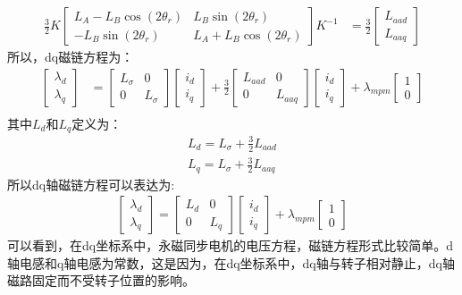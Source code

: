 \begin{align}\label{eq:calculation}
\frac{3}{2}K\begin{bmatrix}
L_{A}-L_{B}\cos(2\theta_{r})&L_{B}\sin(2\theta_{r})\\-L_{B}\sin(2\theta_{r})&L_{A}+L_{B}\cos(2\theta_{r})\end{bmatrix}K^{-1}&=
\frac{3}{2}\begin{bmatrix}L_{aad}\\L_{aaq}\end{bmatrix}
\end{align}
所以，dq磁链方程为：
\begin{align}\label{eq:fluxdq}
\begin{bmatrix}
\lambda_{d}\\\lambda_{q}
\end{bmatrix}
&=\begin{bmatrix}
L_{\sigma}&0\\0&L_{\sigma}\end{bmatrix}
\begin{bmatrix}
i_{d}\\i_{q}
\end{bmatrix}
+\frac{3}{2}\begin{bmatrix}
L_{aad}&0\\0&L_{aaq}\end{bmatrix}
\begin{bmatrix}
i_{d}\\i_{q}
\end{bmatrix}
+
\lambda_{mpm}\begin{bmatrix}
1\\0
\end{bmatrix}\nonumber\\
&
\end{align}
其中$L_{d}$和$L_{q}$定义为：
\begin{align}
L_{d}=L_{\sigma}+\frac{3}{2}L_{aad}\\
L_{q}=L_{\sigma}+\frac{3}{2}L_{aaq}
\end{align}
所以dq轴磁链方程可以表达为:
\begin{align}\label{eq:fluxdq_final}
\begin{bmatrix}
\lambda_{d}\\\lambda_{q}
\end{bmatrix}
=\begin{bmatrix}
	L_{d}&0\\0&L_{q}
\end{bmatrix}\begin{bmatrix}
	i_{d}\\i_{q}
\end{bmatrix}
+
\lambda_{mpm}\begin{bmatrix}
	1\\0
\end{bmatrix}
\end{align}
可以看到，在dq坐标系中，永磁同步电机的电压方程，磁链方程形式比较简单。d轴电感和q轴电感为常数，这是因为，在dq坐标系中，dq轴与转子相对静止，dq轴磁路固定而不受转子位置的影响。

